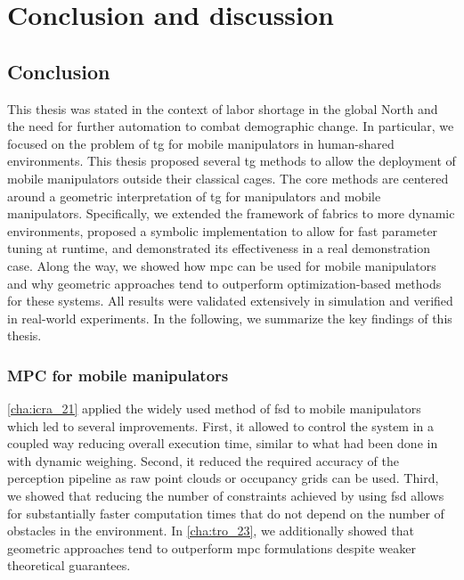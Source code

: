 \chapter{Conclusion and discussion}
\label{cha:conclusion}



\newpage

\section{Conclusion}
\label{sec:conclusion}

This thesis was stated in the context of labor shortage in the global North and
the need for further automation to combat demographic change. In particular, we
focused on the problem of \ac{tg} for mobile manipulators in human-shared
environments. This thesis proposed several \ac{tg} methods to allow the
deployment of mobile manipulators outside their classical cages.
The core methods are centered around a
geometric interpretation of \ac{tg} for
manipulators and mobile manipulators. Specifically, we extended the framework of
\ac{fabrics} to more dynamic environments, proposed a symbolic implementation to
allow for fast parameter tuning at runtime, and demonstrated its effectiveness
in a real demonstration case. Along the way, we showed how \ac{mpc} can be used
for mobile manipulators and why geometric approaches tend to outperform
optimization-based methods for these systems. All results were validated
extensively in simulation and verified in real-world experiments. In the
following, we summarize the key findings of this thesis.

\subsection{MPC for mobile manipulators}
\label{sec:conclusion_mpc}

\cref{cha:icra_21} applied the widely used method of \ac{fsd} to mobile
manipulators which led to several improvements. First, it allowed to control the
system in a coupled way reducing overall execution time, similar to what had
been done in \cite{Avanzini2018} with dynamic weighing. Second, it reduced the
required accuracy of the perception pipeline as raw point clouds or occupancy
grids can be used. Third, we showed that reducing the number of constraints
achieved by using \ac{fsd} allows for substantially faster computation times
that do not depend on the number of obstacles in the environment. In
\cref{cha:tro_23}, we additionally showed that geometric approaches tend to
outperform \ac{mpc} formulations despite weaker theoretical guarantees.

